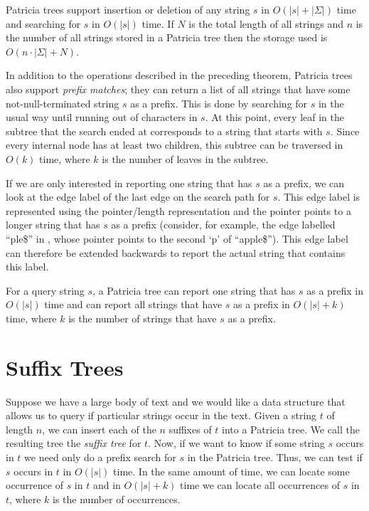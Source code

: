 \begin{thm}
Patricia trees support insertion or deletion of any string $s$ in
$O(|s|+|\Sigma|)$ time and searching for $s$ in $O(|s|)$ time.  If $N$
is the total length of all strings and $n$ is the number of all strings
stored in a Patricia tree then the storage used is $O(n\cdot|\Sigma|+N)$.
\end{thm}

In addition to the operations described in the preceding theorem, Patricia
trees also support \emph{prefix matches}; they can return a list of
all strings that have some not-null-terminated string $s$ as a prefix.
This is done by searching for $s$ in the usual way until running out of
characters in $s$.  At this point, every leaf in the subtree that the
search ended at corresponds to a string that starts with $s$.  Since every
internal node has at least two children, this subtree can be traversed
in $O(k)$ time, where $k$ is the number of leaves in the subtree.

If we are only interested in reporting one string that has $s$ as a
prefix, we can look at the edge label of the last edge on the search
path for $s$.  This edge label is represented using the pointer/length
representation and the pointer points to a longer string that has
$s$ as a prefix (consider, for example, the edge labelled ``ple\$''
in , whose pointer points to the second `p' of
``apple\$'').  This edge label can therefore be extended backwards to
report the actual string that contains this label.

\begin{thm}
For a query string $s$, a Patricia tree can report one string that has $s$ as a prefix in $O(|s|)$ time and can report all strings that have $s$ as a prefix in $O(|s|+k)$ time, where $k$ is the number of strings that have $s$ as a prefix.
\end{thm}

\section{Suffix Trees}

Suppose we have a large body of text and we would like a data structure
that allows us to query if particular strings occur in the text.  Given a
string $t$ of length $n$, we can insert each of the $n$ suffixes of $t$
into a Patricia tree.  We call the resulting tree the \emph{suffix tree}
for $t$.  Now, if we want to know if some string $s$ occurs in $t$
we need only do a prefix search for $s$ in the Patricia tree.  Thus,
we can test if $s$ occurs in $t$ in $O(|s|)$ time.  In the same amount
of time, we can locate some occurrence of $s$ in $t$ and in $O(|s|+k)$
time we can locate all occurrences of $s$ in $t$, where $k$ is the number
of occurrences.

